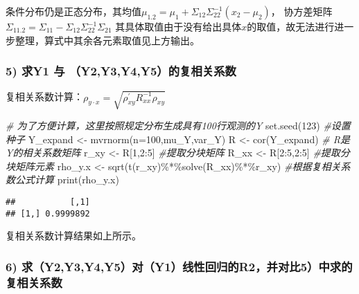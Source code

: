 \documentclass[
]{article}
\newenvironment{Shaded}{\begin{snugshade}}{\end{snugshade}}
\newcommand{\AttributeTok}[1]{\textcolor[rgb]{0.77,0.63,0.00}{#1}}
\newcommand{\CommentTok}[1]{\textcolor[rgb]{0.56,0.35,0.01}{\textit{#1}}}
\newcommand{\DecValTok}[1]{\textcolor[rgb]{0.00,0.00,0.81}{#1}}
\newcommand{\FunctionTok}[1]{\textcolor[rgb]{0.00,0.00,0.00}{#1}}
\newcommand{\NormalTok}[1]{#1}
\newcommand{\OtherTok}[1]{\textcolor[rgb]{0.56,0.35,0.01}{#1}}
\newcommand{\SpecialCharTok}[1]{\textcolor[rgb]{0.00,0.00,0.00}{#1}}
\begin{document}
条件分布仍是正态分布，其均值\(\mu_{1.2}=\mu_1+\Sigma_{12}\Sigma_{22}^{-1}(x_2-\mu_2)\)，
协方差矩阵\(\Sigma_{11.2}=\Sigma_{11}-\Sigma_{12}\Sigma_{22}^{-1}\Sigma_{21}\)
其具体取值由于没有给出具体\(x\)的取值，故无法进行进一步整理，算式中其余各元素取值见上方输出。

\hypertarget{ux6c42y1-ux4e0e-y2y3y4y5ux7684ux590dux76f8ux5173ux7cfbux6570}{%
\subsubsection{\texorpdfstring{\textbf{5) 求Y1 与
（Y2,Y3,Y4,Y5）的复相关系数}}{5) 求Y1 与 （Y2,Y3,Y4,Y5）的复相关系数}}\label{ux6c42y1-ux4e0e-y2y3y4y5ux7684ux590dux76f8ux5173ux7cfbux6570}}

复相关系数计算：\(\rho_{y\cdot x}=\sqrt{\rho_{xy}^\prime R_{xx}^{-1}\rho_{xy}}\)

\begin{Shaded}
\begin{Highlighting}[]
\CommentTok{\# 为了方便计算，这里按照规定分布生成具有100行观测的Y}
\FunctionTok{set.seed}\NormalTok{(}\DecValTok{123}\NormalTok{) }\CommentTok{\#设置种子}
\NormalTok{Y\_expand }\OtherTok{\textless{}{-}} \FunctionTok{mvrnorm}\NormalTok{(}\AttributeTok{n=}\DecValTok{100}\NormalTok{,mu\_Y,var\_Y)}
\NormalTok{R }\OtherTok{\textless{}{-}} \FunctionTok{cor}\NormalTok{(Y\_expand) }\CommentTok{\# R是Y的相关系数矩阵}
\NormalTok{r\_xy }\OtherTok{\textless{}{-}}\NormalTok{ R[}\DecValTok{1}\NormalTok{,}\DecValTok{2}\SpecialCharTok{:}\DecValTok{5}\NormalTok{] }\CommentTok{\#提取分块矩阵}
\NormalTok{R\_xx }\OtherTok{\textless{}{-}}\NormalTok{ R[}\DecValTok{2}\SpecialCharTok{:}\DecValTok{5}\NormalTok{,}\DecValTok{2}\SpecialCharTok{:}\DecValTok{5}\NormalTok{] }\CommentTok{\#提取分块矩阵元素  }
\NormalTok{rho\_y.x }\OtherTok{\textless{}{-}} \FunctionTok{sqrt}\NormalTok{(}\FunctionTok{t}\NormalTok{(r\_xy)}\SpecialCharTok{\%*\%}\FunctionTok{solve}\NormalTok{(R\_xx)}\SpecialCharTok{\%*\%}\NormalTok{r\_xy) }\CommentTok{\#根据复相关系数公式计算}
\FunctionTok{print}\NormalTok{(rho\_y.x)}
\end{Highlighting}
\end{Shaded}

\begin{verbatim}
##           [,1]
## [1,] 0.9999892
\end{verbatim}

复相关系数计算结果如上所示。

\hypertarget{ux6c42y2y3y4y5ux5bf9y1ux7ebfux6027ux56deux5f52ux7684r2ux5e76ux5bf9ux6bd45ux4e2dux6c42ux7684ux590dux76f8ux5173ux7cfbux6570}{%
\subsubsection{\texorpdfstring{\textbf{6)
求（Y2,Y3,Y4,Y5）对（Y1）线性回归的R2，并对比5）中求的复相关系数}}{6) 求（Y2,Y3,Y4,Y5）对（Y1）线性回归的R2，并对比5）中求的复相关系数}}\label{ux6c42y2y3y4y5ux5bf9y1ux7ebfux6027ux56deux5f52ux7684r2ux5e76ux5bf9ux6bd45ux4e2dux6c42ux7684ux590dux76f8ux5173ux7cfbux6570}}
\end{document}
